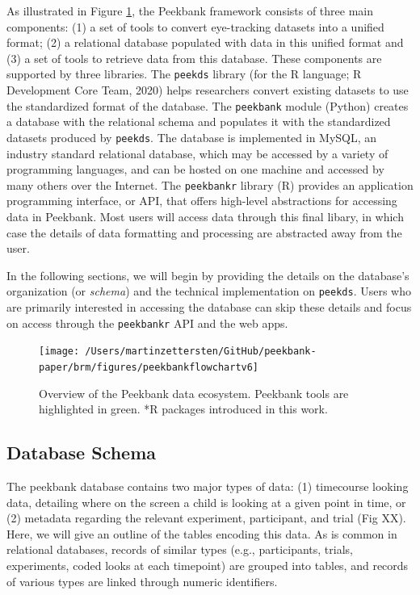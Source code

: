 \documentclass[
  english,
  man,floatsintext]{apa6}
\begin{document}
As illustrated in Figure \ref{fig:fig-framework-overview}, the Peekbank framework consists of three main components: (1) a set of tools to convert eye-tracking datasets into a unified format; (2) a relational database populated with data in this unified format and (3) a set of tools to retrieve data from this database.
These components are supported by three libraries.
The \texttt{peekds} library (for the R language; R Development Core Team, 2020) helps researchers convert existing datasets to use the standardized format of the database.
The \texttt{peekbank} module (Python) creates a database with the relational schema and populates it with the standardized datasets produced by \texttt{peekds}.
The database is implemented in MySQL, an industry standard relational database, which may be accessed by a variety of programming languages, and can be hosted on one machine and accessed by many others over the Internet.
The \texttt{peekbankr} library (R) provides an application programming interface, or API, that offers high-level abstractions for accessing data in Peekbank.
Most users will access data through this final libary, in which case the details of data formatting and processing are abstracted away from the user.

In the following sections, we will begin by providing the details on the database's organization (or \textit{schema}) and the technical implementation on \texttt{peekds}.
Users who are primarily interested in accessing the database can skip these details and focus on access through the \texttt{peekbankr} API and the web apps.

\begin{figure}

{\centering \texttt{[image: /Users/martinzettersten/GitHub/peekbank-paper/brm/figures/peekbankflowchartv6]} 

}

\caption{Overview of the Peekbank data ecosystem. Peekbank tools are highlighted in green. *R packages introduced in this work.}\label{fig:fig-framework-overview}
\end{figure}

\hypertarget{database-schema}{%
\subsection{Database Schema}\label{database-schema}}

The peekbank database contains two major types of data: (1) timecourse looking data, detailing where on the screen a child is looking at a given point in time, or (2) metadata regarding the relevant experiment, participant, and trial (Fig XX).
Here, we will give an outline of the tables encoding this data.
As is common in relational databases, records of similar types (e.g., participants, trials, experiments, coded looks at each timepoint) are grouped into tables, and records of various types are linked through numeric identifiers.
\end{document}
